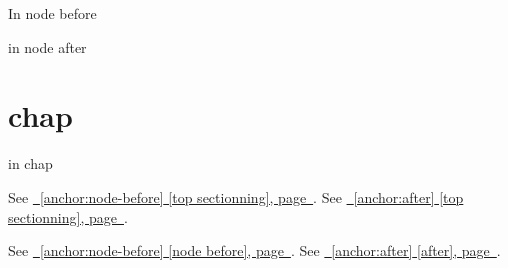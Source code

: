 \documentclass{book}
\newcommand{\Texinfothechapterheading}{}
\newcommand{\Texinfoheadingchaptername}{\chaptername}
\newcommand{\Texinfochapter}[1]{\chapter{#1}
\renewcommand{\Texinfothechapterheading}{\Texinfoheadingchaptername{} \thechapter{} }%
}%
\renewcommand{\_}{\Texinfounderscore\discretionary{}{}{}}
\begin{document}
\label{anchor:node-before}%

In node before

\label{anchor:Top}%
\label{anchor:after}%

in node after

\Texinfochapter{{chap}}
\label{anchor:chap}%

in chap

See \hyperref[anchor:node-before]{\chaptername~\ref*{anchor:node-before} [top sectionning], page~\pageref*{anchor:node-before}}.
See \hyperref[anchor:after]{\chaptername~\ref*{anchor:after} [top sectionning], page~\pageref*{anchor:after}}.

See \hyperref[anchor:node-before]{\chaptername~\ref*{anchor:node-before} [node before], page~\pageref*{anchor:node-before}}.
See \hyperref[anchor:after]{\chaptername~\ref*{anchor:after} [after], page~\pageref*{anchor:after}}.
\end{document}
